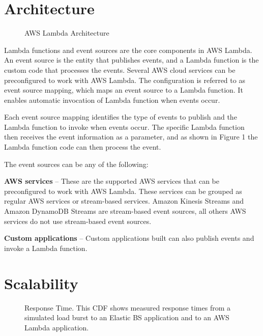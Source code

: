 \documentclass[9pt,twocolumn,twoside]{../../styles/osajnl}
\begin{document}
\section{Architecture}

\begin{figure}[h]
\centering
\graphicspath{ {images/} }
\caption{AWS Lambda Architecture} \cite{www-AWSLambda}
\label{fig:false-color}
\end{figure}

Lambda functions and event sources are the core components in AWS Lambda. An 
event source is the entity that publishes events, and a Lambda function is the 
custom code that processes the events. Several AWS cloud services can be 
preconfigured to work with AWS Lambda. The configuration is referred to as 
event source mapping, which maps an event source to a Lambda function. It 
enables automatic invocation of Lambda function when events occur.

Each event source mapping identifies the type of events to publish and the 
Lambda function to invoke when events occur. The specific Lambda function then 
receives the event information as a parameter, and as shown in Figure 1 the 
Lambda function code can then process the event.

The event sources can be any of the following:

\textbf{AWS services} – These are the supported AWS services that can be 
preconfigured to work with AWS Lambda. These services can be grouped as regular 
AWS services or stream-based services. Amazon Kinesis Streams 
\cite{www-AWSKinesis} and Amazon DynamoDB Streams \cite{www-AWSDynamoStream} 
are stream-based event sources, all others AWS services do not use stream-based 
event sources. 
 
\textbf{Custom applications} – Custom applications built can also publish 
events and invoke a Lambda function.

\section{Scalability}

\begin{figure}[H]
\centering
\graphicspath{ {images/} }
\caption{Response Time. This CDF shows measured
response times from a simulated load burst to an Elastic BS
application and to an AWS Lambda application.}  \cite{OpenLambda}
\label{fig:false-color}
\end{figure}
\end{document}
